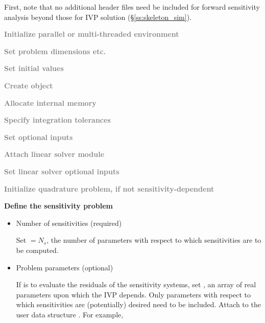 First, note that no additional header files need be included for
forward sensitivity analysis beyond those for IVP solution
(\S\ref{ss:skeleton_sim}).
 \begin{Steps}
  
\item 
  \textcolor{gray}{\bf Initialize parallel or multi-threaded environment}

\item
  \textcolor{gray}{\bf Set problem dimensions etc.}

\item
  \textcolor{gray}{\bf Set initial values}
 
\item
  \textcolor{gray}{\bf Create {\idas} object}

\item
  \textcolor{gray}{\bf Allocate internal memory}

\item
  \textcolor{gray}{\bf Specify integration tolerances}

\item
  \textcolor{gray}{\bf Set optional inputs}

\item
  \textcolor{gray}{\bf Attach linear solver module}

\item
  \textcolor{gray}{\bf Set linear solver optional inputs}

\item
  \textcolor{gray}{\bf Initialize quadrature problem, if not sensitivity-dependent}

\item \label{i:fwd_start}
  {\bf Define the sensitivity problem}

  \begin{itemize}

    \item Number of sensitivities (required)

      Set  $= N_s$, the number of parameters with respect to which sensitivities
      are to be computed.
  
    \item Problem parameters (optional)

      If {\idas} is to evaluate the residuals of the sensitivity 
      systems, set , an array of  real parameters upon which the IVP 
      depends. Only parameters with respect to which sensitivities are (potentially) 
      desired need to be included. 
      Attach  to the user data structure . 
      For example, 


\end{itemize}
\end{Steps}
